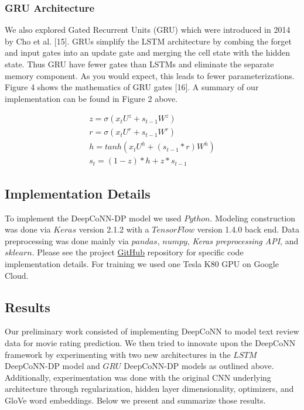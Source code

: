 \documentclass[10pt, twocolumn, letterpaper]{article}
\begin{document}
\subsubsection{GRU Architecture}
We also explored Gated Recurrent Units (GRU) which were introduced in 2014 by Cho et al. [15]. GRUs simplify the LSTM architecture by combing the forget and input gates into an update gate and merging the cell state with the
hidden state. Thus GRU have fewer gates than LSTMs and eliminate the separate memory component. As you would expect, this leads to fewer parameterizations. Figure 4 shows the mathematics of GRU gates [16]. A summary of our implementation can be found in Figure 2 above.

\begin{center}
\begin{gather}
z = \sigma(x_t U^z + s_{t-1}W^z) \\
r = \sigma(x_t U^r + s_{t-1}W^r) \\
h = tanh(x_t U^h + (s_{t-1} * r) W^h) \\
s_t = (1-z) * h + z * s_{t-1}
\end{gather}
\end{center}


\subsection{Implementation Details}

To implement the DeepCoNN-DP model we used $Python$. Modeling construction was done via $Keras$ version 2.1.2 with a $TensorFlow$ version 1.4.0 back end. Data preprocessing was done mainly via $pandas$, $numpy$, \textit{Keras preprocessing API}, and $sklearn$. Please see the project \href{https://github.com/michaelAlvarino/Deep-Learning}{GitHub} repository for specific code implementation details. For training we used one Tesla K80 GPU on Google Cloud.

\subsection{Results}

Our preliminary work consisted of implementing DeepCoNN to model text review data for movie rating prediction. We then tried to innovate upon the DeepCoNN framework by experimenting with two new architectures in the $LSTM$ DeepCoNN-DP model and $GRU$ DeepCoNN-DP models as outlined above. Additionally, experimentation was done with the original CNN underlying architecture through regularization, hidden layer dimensionality, optimizers, and GloVe word embeddings. Below we present and summarize those results.
\end{document}

